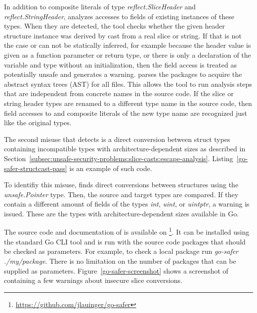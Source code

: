 In addition to composite literals of type \textit{reflect.SliceHeader} and \textit{reflect.StringHeader}, \toolSafer{}
analyzes accesses to fields of existing instances of these types.
When they are detected, the tool checks whether the given header structure instance was derived by cast from a real
slice or string.
If that is not the case or can not be statically inferred, for example because the header value is given as a function
parameter or return type, or there is only a declaration of the variable and type without an initialization, then the
field access is treated as potentially unsafe and \toolSafer{} generates a warning.
\toolSafer{} parses the packages to acquire the abstract syntax trees (\acrshort{AST}) for all files.
This allows the tool to run analysis steps that are independent from concrete names in the source code.
If the slice or string header types are renamed to a different type name in the source code, then field accesses to and
composite literals of the new type name are recognized just like the original types.

The second misuse that \toolSafer{} detects is a direct conversion between struct types containing incompatible types
with architecture-dependent sizes as described in
Section~\ref{subsec:unsafe-security-problems:slice-casts:escape-analysis}.
Listing~\ref{go-safer-structcast-pass} is an example of such code.



To identifiy this misuse, \toolSafer{} finds direct conversions between structures using the \textit{unsafe.Pointer}
type.
Then, the source and target types are compared.
If they contain a different amount of fields of the types \textit{int}, \textit{uint}, or \textit{uintptr}, a warning
is issued.
These are the types with architecture-dependent sizes available in Go.

The source code and documentation of \toolSafer{} is available on
\github{}\footnote{\url{https://github.com/jlauinger/go-safer}}.
It can be installed using the standard Go \acrshort{CLI} tool and is run with the source code packages that should be
checked as parameters.
For example, to check a local package run \textit{go-safer ./my/package}.
There is no limitation on the number of packages that can be supplied as parameters.
Figure~\ref{go-safer-screenshot} shows a screenshot of \toolSafer{} containing a few warnings about insecure slice
conversions.



